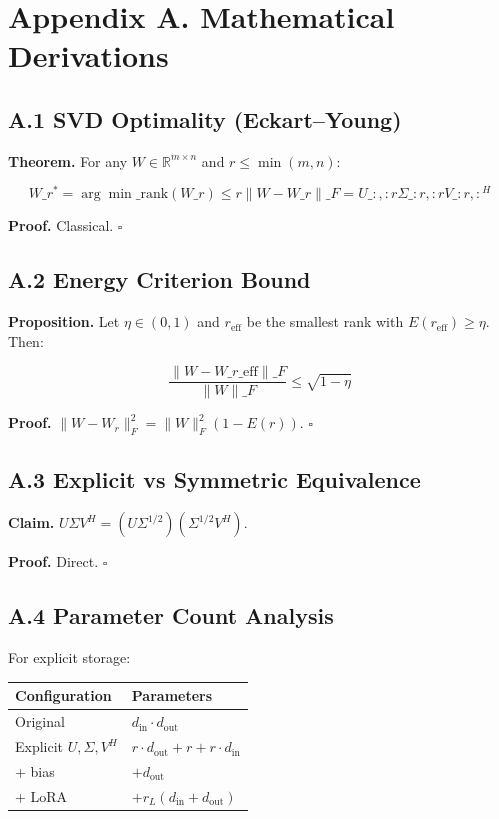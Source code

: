 
\section{Appendix A. Mathematical Derivations}

\subsection{A.1 SVD Optimality (Eckart--Young)}

\textbf{Theorem.} For any $W \in \mathbb{R}^{m \times n}$ and $r \leq \min(m, n)$:

\[
W\_r^* = \arg\min\_{\text{rank}(W\_r) \leq r} \|W - W\_r\|\_F = U\_{:, :r} \Sigma\_{:r, :r} V\_{:r, :}^H
\tag{A.1}
\]

\textbf{Proof.} Classical. $\square$

\subsection{A.2 Energy Criterion Bound}

\textbf{Proposition.} Let $\eta \in (0, 1)$ and $r_\text{eff}$ be the smallest 
rank with $E(r_\text{eff}) \geq \eta$. Then:

\[
\frac{\|W - W\_{r\_\text{eff}}\|\_F}{\|W\|\_F} \leq \sqrt{1 - \eta}
\tag{A.2}
\]

\textbf{Proof.} $\|W - W_r\|_F^2 = \|W\|_F^2 (1 - E(r))$. $\square$

\subsection{A.3 Explicit vs Symmetric Equivalence}

\textbf{Claim.} $U \Sigma V^H = (U \Sigma^{1/2}) (\Sigma^{1/2} V^H)$.

\textbf{Proof.} Direct. $\square$

\subsection{A.4 Parameter Count Analysis}

For explicit storage:

\begin{table}[H]
\centering
\small
\begin{tabular}{ll}
\toprule
\textbf{Configuration} & \textbf{Parameters} \\
\midrule
Original & $d_\text{in} \cdot d_\text{out}$ \\
Explicit $U, \Sigma, V^H$ & $r \cdot d_\text{out} + r + r \cdot d_\text{in}$ \\
+ bias & $+ d_\text{out}$ \\
+ LoRA & $+ r_L(d_\text{in} + d_\text{out})$ \\
\bottomrule
\end{tabular}
\end{table}


